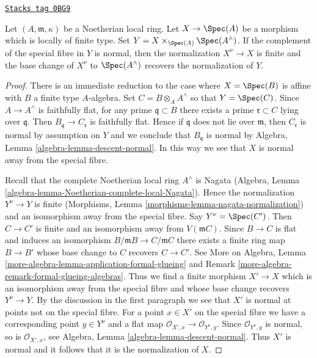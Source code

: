\begin{lemma}
\label{resolve-lemma-normalization-completion}
\href{https://stacks.math.columbia.edu/tag/0BG9}{\texttt{Stacks tag 0BG9}}

Let $(A, \mathfrak m, \kappa)$ be a Noetherian local ring.
Let $X \to \Spec(A)$ be a morphism which is locally of finite type.
Set $Y = X \times_{\Spec(A)} \Spec(A^\wedge)$.
If the complement of the special fibre in $Y$ is normal, then
the normalization $X^\nu \to X$ is finite and the base change
of $X^\nu$ to $\Spec(A^\wedge)$ recovers the normalization of $Y$.
\end{lemma}

\begin{proof}
There is an immediate reduction to the case where $X = \Spec(B)$
is affine with $B$ a finite type $A$-algebra. Set $C = B \otimes_A A^\wedge$
so that $Y = \Spec(C)$. Since
$A \to A^\wedge$ is faithfully flat, for any prime $\mathfrak q \subset B$
there exists a prime $\mathfrak r \subset C$ lying over $\mathfrak q$.
Then $B_\mathfrak q \to C_\mathfrak r$ is faithfully flat. Hence if
$\mathfrak q$ does not lie over $\mathfrak m$, then $C_\mathfrak r$
is normal by assumption on $Y$ and we conclude that $B_\mathfrak q$
is normal by Algebra, Lemma \ref{algebra-lemma-descent-normal}.
In this way we see that $X$ is normal away from the special fibre.

\medskip\noindent
Recall that the complete Noetherian local ring $A^\wedge$ is Nagata
(Algebra, Lemma \ref{algebra-lemma-Noetherian-complete-local-Nagata}).
Hence the normalization $Y^\nu \to Y$ is finite
(Morphisms, Lemma \ref{morphisms-lemma-nagata-normalization})
and an isomorphism away from the special fibre. Say $Y^\nu = \Spec(C')$.
Then $C \to C'$ is finite and an isomorphism away from $V(\mathfrak m C)$.
Since $B \to C$ is flat and induces an isomorphism
$B/\mathfrak m B \to C/\mathfrak m C$ there exists a finite
ring map $B \to B'$ whose base change to $C$ recovers $C \to C'$.
See More on Algebra, Lemma
\ref{more-algebra-lemma-application-formal-glueing} and
Remark \ref{more-algebra-remark-formal-glueing-algebras}.
Thus we find a finite morphism $X' \to X$ which is an isomorphism
away from the special fibre and whose base change recovers $Y^\nu \to Y$.
By the discussion in the first paragraph we see that $X'$ is normal at
points not on the special fibre. For a point $x \in X'$ on the special
fibre we have a corresponding point $y \in Y^\nu$ and a flat map
$\mathcal{O}_{X', x} \to \mathcal{O}_{Y^\nu, y}$.
Since $\mathcal{O}_{Y^\nu, y}$ is normal, so is $\mathcal{O}_{X', x}$, see
Algebra, Lemma \ref{algebra-lemma-descent-normal}.
Thus $X'$ is normal and it follows that it is the normalization of $X$.
\end{proof}

